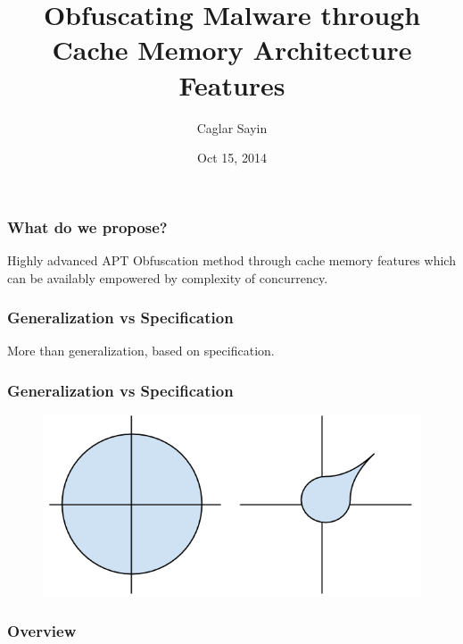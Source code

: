 \documentclass{beamer}
\title[Cache Oriented Obfuscation]{Obfuscating Malware through Cache Memory Architecture Features} %
\author{Caglar Sayin} %
\institute[HIG] %
{
Gjovik University, Norwegian Information Security Laboratory \\ %
\medskip
\textit{me@caglarsay.in} %
}
\date{Oct 15, 2014} %
\begin{document}
\begin{frame}
\titlepage %
\end{frame}




\begin{frame}
	\frametitle{What do we propose?}
	\Large
	Highly advanced APT Obfuscation method through cache memory features which can be availably empowered by complexity of concurrency.
\end{frame}


\begin{frame}
	\frametitle{Generalization vs Specification}
	\Large
	More than generalization, based on specification. 
\end{frame}

\begin{frame}
	\frametitle{Generalization vs Specification}
		\begin{figure}
			\includegraphics[width=0.8\linewidth]{img/spvsgn.png}
		\end{figure}
\end{frame}



\begin{frame}
\frametitle{Overview} %
\setcounter{tocdepth}{1}

\tableofcontents %
\end{frame}
\end{document}
